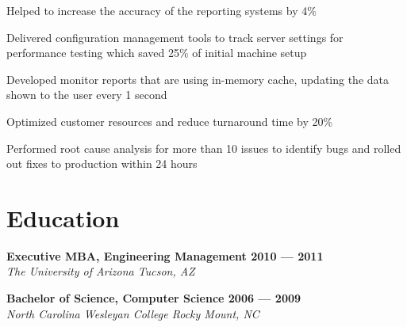\documentclass[11pt,english]{article}
\begin{document}
  \begin{zitemize}

    \item Helped to increase the accuracy of the reporting systems by 4\%

    \item Delivered configuration management tools to track server settings for performance testing which saved 25\% of initial machine setup

    \item Developed monitor reports that are using in-memory cache, updating the data shown to the user every 1 second

    \item Optimized customer resources and reduce turnaround time by 20\%

    \item Performed root cause analysis for more than 10 issues to identify bugs and rolled out fixes to production within 24 hours

  \end{zitemize}

\section{Education}

  {\bfseries{Executive MBA, Engineering Management \hfill	2010 --- 2011}} \\
  \textit{The University of Arizona \hfill	Tucson, AZ} \\
  \vspace{0.5em}

  {\bfseries{Bachelor of Science, Computer Science \hfill	2006 --- 2009}} \\
  \textit{North Carolina Wesleyan College \hfill	Rocky Mount, NC} \\
  \vspace{0.5em}
\end{document}
